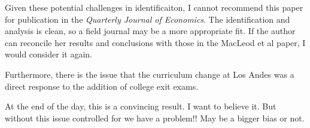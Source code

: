 \documentclass[a4paper, 11pt]{article}
\begin{document}
Given these potential challenges in identificaiton, I cannot recommend this paper for publication in the \textit{Quarterly Journal of Economics}.   The identification and analysis is clean, so a field journal may be a more appropriate fit.  If the author can reconcile her results and conclusions with those in the MacLeod et al paper, I would consider it again. 

Furthermore, there is the issue that the curriculum change at Los Andes was a direct response to the addition of college exit exams.  

At the end of the day, this is a convincing result. I want to believe it.  But without this issue controlled for we have a problem!! May be a bigger bias or not. 

 
\end{document}
